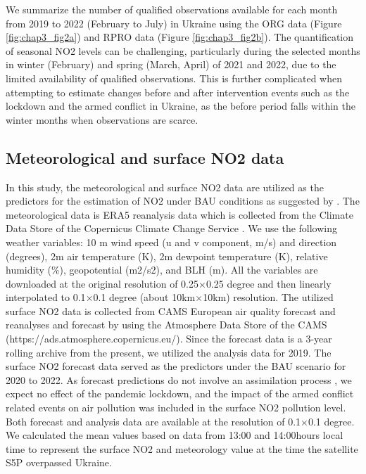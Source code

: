 We summarize the number of qualified observations available for each month from 2019 to 2022 (February to July) in Ukraine using the ORG data (Figure \ref{fig:chap3_fig2a}) and RPRO data (Figure \ref{fig:chap3_fig2b}). The quantification of seasonal NO2 levels can be challenging, particularly during the selected months in winter (February) and spring (March, April) of 2021 and 2022, due to the limited availability of qualified observations. This is further complicated when attempting to estimate changes before and after intervention events such as the lockdown and the armed conflict in Ukraine, as the before period falls within the winter months when observations are scarce.\par

\subsection{Meteorological and surface NO2 data}
In this study, the meteorological and surface NO2 data are utilized as the predictors for the estimation of NO2 under BAU conditions as suggested by \citep{barre2021estimating}. The meteorological data is ERA5 reanalysis data which is collected from the Climate Data Store of the Copernicus Climate Change Service \citep{hersbach2018era5}. We use the following weather variables: 10 m wind speed  (u and v component, m/s) and direction (degrees), 2m air temperature (K), 2m dewpoint temperature (K), relative humidity (\%), geopotential (m2/s2), and BLH (m). All the variables are downloaded at the original resolution of 0.25$\times$0.25 degree and then linearly interpolated to 0.1$\times$0.1 degree (about 10km$\times$10km) resolution. The utilized surface NO2 data is collected from CAMS European air quality forecast and reanalyses and forecast \citep{marecal2015regional} by using the Atmosphere Data Store of the CAMS (https://ads.atmosphere.copernicus.eu/). Since the forecast data is a 3-year rolling archive from the present, we utilized the analysis data for 2019. The surface NO2 forecast data served as the predictors under the BAU scenario for 2020 to 2022. As forecast predictions do not involve an assimilation process \citep{barre2021estimating}, we expect no effect of the pandemic lockdown, and the impact of the armed conflict related events on air pollution was included in the surface NO2 pollution level. Both forecast and analysis data are available at the resolution of 0.1$\times$0.1 degree. We calculated the mean values based on data from 13:00 and 14:00hours local time to represent the surface NO2 and meteorology value at the time the satellite S5P overpassed Ukraine. \par
